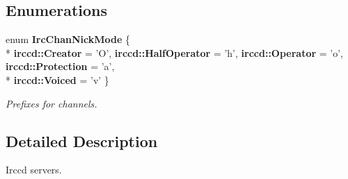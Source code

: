 \subsection*{Enumerations}
\begin{DoxyCompactItemize}
\item 
enum {\bfseries Irc\-Chan\-Nick\-Mode} \{ \\*
{\bfseries irccd\-::\-Creator} = 'O', 
{\bfseries irccd\-::\-Half\-Operator} = 'h', 
{\bfseries irccd\-::\-Operator} = 'o', 
{\bfseries irccd\-::\-Protection} = 'a', 
\\*
{\bfseries irccd\-::\-Voiced} = 'v'
 \}
\begin{DoxyCompactList}\small\item\em Prefixes for channels. \end{DoxyCompactList}\end{DoxyCompactItemize}


\subsection{Detailed Description}
Irccd servers. 